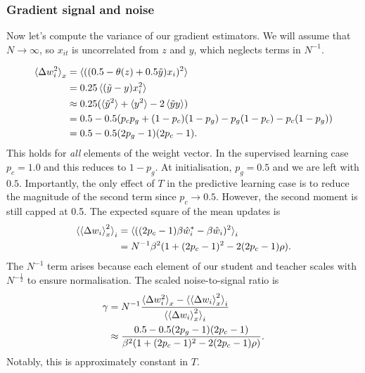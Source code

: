 \documentclass{article}
\begin{document}
\subsubsection*{Gradient signal and noise}


Now let's compute the variance of our gradient estimators.
We will assume that $N \rightarrow \infty$, so $x_{it}$ is uncorrelated from $z$ and $y$, which neglects terms in $N^{-1}$.

\begin{align}
    \braket{\Delta w_i^2}_{x} &= \braket{((0.5 - \theta (z) + 0.5 \tilde{y})x_i)^2}\\
    &= 0.25 \braket{(\tilde{y} - y)x_{i}^2}\\
    &\approx 0.25 (\braket{\tilde{y}^2} + \braket{y^2} - 2 \braket{\tilde{y} y})\\
    &= 0.5 - 0.5 (p_c p_g + (1-p_c)(1-p_g) - p_g(1-p_c) - p_c(1-p_g))\\
    &= 0.5 - 0.5 (2 p_g - 1) (2 p_c - 1).
\end{align}
This holds for \emph{all} elements of the weight vector.
In the supervised learning case $p_c = 1.0$ and this reduces to $1 - p_g$.
At initialisation, $p_g = 0.5$ and we are left with $0.5$.
Importantly, the only effect of $T$ in the predictive learning case is to reduce the magnitude of the second term since $p_c \rightarrow 0.5$.
However, the second moment is still capped at 0.5.
The expected square of the mean updates is
\begin{align}
    \braket{\braket{\Delta w_i}_x^2}_i &= \braket{((2 p_c - 1) \beta \hat{w}^*_i - \beta \hat{w}_i)^2}_i\\
    &= N^{-1} \beta^2 ( 1 + (2p_c-1)^2 - 2 (2 p_c - 1) \rho ).
\end{align}
The $N^{-1}$ term arises because each element of our student and teacher scales with $N^{-\frac12}$ to ensure normalisation.
The scaled noise-to-signal ratio is
\begin{align}
    \gamma &= N^{-1} \frac{\braket{\Delta w_i^2}_{x} - \braket{\braket{\Delta w_i}_x^2}_i}{\braket{\braket{\Delta w_i}_x^2}_i}\\
    &\approx \frac{0.5 - 0.5 (2 p_g - 1) (2 p_c - 1)}{\beta^2 ( 1 + (2p_c-1)^2 - 2 (2 p_c - 1) \rho )}.
\end{align}
Notably, this is approximately constant in $T$.
\end{document}
